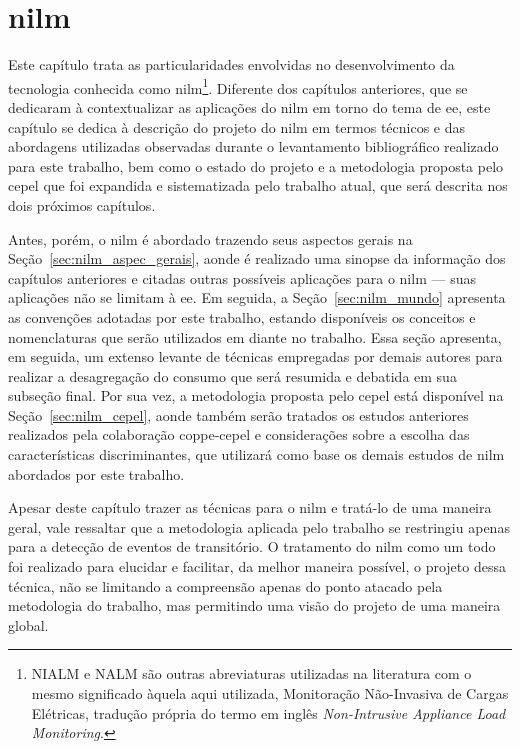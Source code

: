 \chapter[Monitoração Não-Invasiva de Cargas Elétricas]{\acrfull{nilm}}
\label{cap:nilm}

Este capítulo trata as particularidades envolvidas no
desenvolvimento da tecnologia conhecida como \gls{nilm}\footnote{NIALM
e NALM são outras abreviaturas utilizadas na literatura com o mesmo
significado àquela aqui utilizada, Monitoração
Não-Invasiva de Cargas Elétricas, tradução própria do
termo em inglês \emph{Non-Intrusive Appliance Load Monitoring}.}.
Diferente dos capítulos anteriores, que
se dedicaram à contextualizar as aplicações do \acs{nilm} em torno do
tema de \acs{ee}, este capítulo se dedica à descrição do projeto do
\acs{nilm} em termos técnicos e das abordagens utilizadas observadas
durante o levantamento bibliográfico realizado para este trabalho, bem
como o estado do projeto e a metodologia proposta pelo \acs{cepel} que
foi expandida e sistematizada pelo trabalho atual, que será descrita
nos dois próximos capítulos.

Antes, porém, o \acs{nilm} é abordado trazendo seus aspectos gerais na
Seção~\ref{sec:nilm_aspec_gerais}, aonde é realizado uma sinopse da
informação dos capítulos anteriores e citadas outras possíveis
aplicações para o \acs{nilm} --- suas aplicações não se limitam à
\acs{ee}. Em seguida, a Seção~\ref{sec:nilm_mundo} apresenta as
convenções adotadas por este trabalho, estando disponíveis os
conceitos e nomenclaturas que serão utilizados em diante no trabalho.
Essa seção apresenta, em seguida, um extenso levante de técnicas
empregadas por demais autores para realizar a desagregação do consumo
que será resumida e debatida em sua subseção final.  Por sua vez, a
metodologia proposta pelo \acs{cepel} está disponível na
Seção~\ref{sec:nilm_cepel}, aonde também serão tratados os estudos
anteriores realizados pela colaboração \acs{coppe}-\acs{cepel} e
considerações sobre a escolha das características discriminantes, que
utilizará como base os demais estudos de \acs{nilm} abordados por este
trabalho. 

Apesar deste capítulo trazer as técnicas para o \acs{nilm} e tratá-lo
de uma maneira geral, vale ressaltar que a metodologia aplicada pelo
trabalho se restringiu apenas para a detecção de eventos de
transitório. O tratamento do \acs{nilm} como um todo foi realizado
para elucidar e facilitar, da melhor maneira possível, o projeto dessa
técnica, não se limitando a compreensão apenas do ponto atacado pela
metodologia do trabalho, mas permitindo uma visão do projeto de uma
maneira global.


